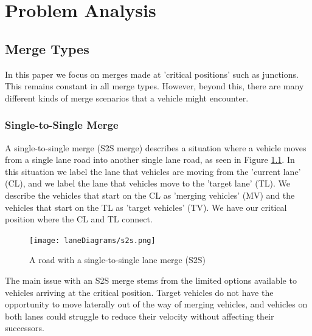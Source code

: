 \chapter{Problem Analysis}
\label{cha:Problem Analysis}

\section{Merge Types}
\label{sec:Merge Types}
In this paper we focus on merges made at 'critical positions' such as junctions. This remains constant in all merge types. However, beyond this, there are many different kinds of merge scenarios that a vehicle might encounter.

\subsection{Single-to-Single Merge}
\label{subsec:Single-to-Single Merge}
A single-to-single merge (S2S merge) describes a situation where a vehicle moves from a single lane road into another single lane road, as seen in Figure \ref{fig:S2SMerge}. In this situation we label the lane that vehicles are moving from the 'current lane' (CL), and we label the lane that vehicles move to the 'target lane' (TL). We describe the vehicles that start on the CL as 'merging vehicles' (MV) and the vehicles that start on the TL as 'target vehicles' (TV). We have our critical position where the CL and TL connect.

\begin{figure}[htb]
\texttt{[image: laneDiagrams/s2s.png]}
\caption{A road with a single-to-single lane merge (S2S)}
\label{fig:S2SMerge}
\end{figure}

The main issue with an S2S merge stems from the limited options available to vehicles arriving at the critical position. Target vehicles do not have the opportunity to move laterally out of the way of merging vehicles, and vehicles on both lanes could struggle to reduce their velocity without affecting their successors.


